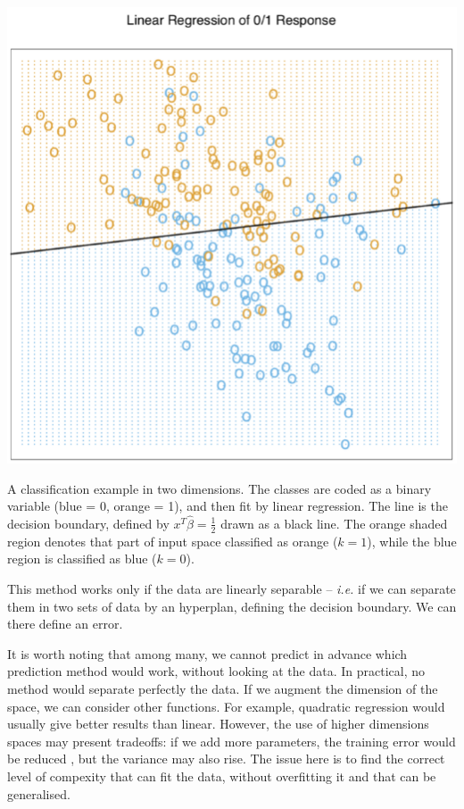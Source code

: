 \documentclass[a4paper]{tufte-book}
\newcommand{\hairsp}{\hspace{1pt}}%
\newcommand{\ie}{\textit{i.\hairsp{}e.}\xspace}
\newcommand{\half}{\frac{1}{2}}
\begin{document}
\begin{marginfigure}
    \includegraphics{./Figures/decboundary2D1.png}
    \caption{A classification example in two dimensions. The classes are coded
        as a binary variable (blue = 0, orange = 1), and then fit by linear
        regression. The line is the decision boundary, defined by
        $x^T \hat \beta = \half$ drawn as a black line. The orange shaded region
        denotes that part of input space classified as orange ($k=1$), while the
        blue region is classified as blue ($k=0$).
    }
    \label{decboundary2D1}
\end{marginfigure}

This method works only if the data are linearly separable -- \ie if we can
separate them in two sets of data by an hyperplan, defining the decision
boundary. We can there define an error.

It is worth noting that among many, we cannot predict in advance which prediction
method would work, without looking at the data. In practical, no method would
separate perfectly the data. If we augment the dimension of the space, we can
consider other functions. For example, quadratic regression would usually give
better results than linear. However, the use of higher dimensions spaces may
present tradeoffs: if we add more parameters, the training error would be reduced
, but the variance may also rise.
The issue here is to find the correct level of compexity that can fit the data,
without overfitting it and that can be generalised.
\end{document}
